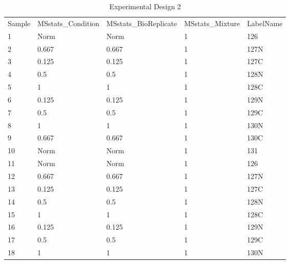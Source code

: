 \begin{table}[ht]
\caption{Experimental Design 2}
\label{t:isobaric_experimental_design_table_1}
\centering
\tiny
\begin{tabular*}{0.90\textwidth}{lllll}
Sample & MSstats\_Condition & MSstats\_BioReplicate & MSstats\_Mixture & LabelName \\
1      & Norm               & Norm                  & 1                & 126       \\
2      & 0.667              & 0.667                 & 1                & 127N      \\
3      & 0.125              & 0.125                 & 1                & 127C      \\
4      & 0.5                & 0.5                   & 1                & 128N      \\
5      & 1                  & 1                     & 1                & 128C      \\
6      & 0.125              & 0.125                 & 1                & 129N      \\
7      & 0.5                & 0.5                   & 1                & 129C      \\
8      & 1                  & 1                     & 1                & 130N      \\
9      & 0.667              & 0.667                 & 1                & 130C      \\
10     & Norm               & Norm                  & 1                & 131       \\
11     & Norm               & Norm                  & 1                & 126       \\
12     & 0.667              & 0.667                 & 1                & 127N      \\
13     & 0.125              & 0.125                 & 1                & 127C      \\
14     & 0.5                & 0.5                   & 1                & 128N      \\
15     & 1                  & 1                     & 1                & 128C      \\
16     & 0.125              & 0.125                 & 1                & 129N      \\
17     & 0.5                & 0.5                   & 1                & 129C      \\
18     & 1                  & 1                     & 1                & 130N      \\

\end{tabular*}
\end{table}
